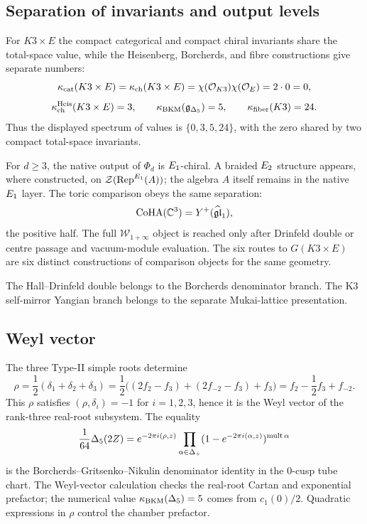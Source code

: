 \subsection*{Separation of invariants and output levels}

For $K3\times E$ the compact categorical and compact chiral invariants
share the total-space value, while the Heisenberg, Borcherds, and
fibre constructions give separate numbers:
\[
  \kappa_{\mathrm{cat}}(K3\times E)
  =\kappa_{\mathrm{ch}}(K3\times E)
  =\chi(\mathcal{O}_{K3})\chi(\mathcal{O}_E)
  =2\cdot0=0,
\]
\[
  \kappa_{\mathrm{ch}}^{\mathrm{Heis}}(K3\times E)=3,
  \qquad
  \kappa_{\mathrm{BKM}}(\mathfrak g_{\Delta_{5}})=5,
  \qquad
  \kappa_{\mathrm{fiber}}(K3)=24.
\]
Thus the displayed spectrum of values is $\{0,3,5,24\}$, with the
zero shared by two compact total-space invariants.

For $d\geq3$, the native output of $\Phi_d$ is $E_1$-chiral. A braided
$E_2$ structure appears, where constructed, on
$\mathcal Z(\mathrm{Rep}^{E_1}(A))$; the algebra $A$ itself remains
in the native $E_1$ layer.
The toric comparison obeys the same separation:
\[
  \mathrm{CoHA}(\mathbb{C}^3)=Y^+(\widehat{\mathfrak{gl}}_1),
\]
the positive half. The full $\mathcal W_{1+\infty}$ object is reached
only after Drinfeld double or centre passage and vacuum-module
evaluation. The six routes to $G(K3\times E)$ are six distinct
constructions of comparison objects for the same geometry.

The Hall--Drinfeld double belongs to the Borcherds denominator branch.
The K3 self-mirror
Yangian branch belongs to the separate Mukai-lattice presentation.

\subsection*{Weyl vector}

The three Type-II simple roots determine
\[
  \rho=\frac12(\delta_1+\delta_2+\delta_3)
  =\frac12\bigl((2f_2-f_3)+(2f_{-2}-f_3)+f_3\bigr)
  =f_2-\frac12 f_3+f_{-2}.
\]
This $\rho$ satisfies $(\rho,\delta_i)=-1$ for
$i=1,2,3$, hence it is the Weyl vector of the rank-three real-root
subsystem. The equality
\[
  \frac{1}{64}\Delta_{5}(2Z)
  =
  e^{-2\pi i(\rho,z)}
  \prod_{\alpha\in\Delta_+}
  (1-e^{-2\pi i(\alpha,z)})^{\mathrm{mult}\,\alpha}
\]
is the Borcherds--Gritsenko--Nikulin denominator identity in the
$0$-cusp tube chart. The Weyl-vector calculation checks the real-root
Cartan and exponential prefactor; the numerical value
$\kappa_{\mathrm{BKM}}(\Delta_{5})=5$ comes from $c_1(0)/2$. Quadratic expressions in
$\rho$ control the chamber prefactor.

